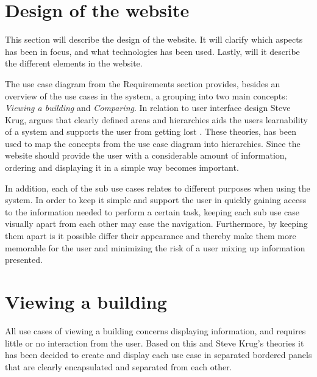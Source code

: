 \section{Design of the website}
This section will describe the design of the website. It will clarify which aspects has been in focus, and what technologies has been used. Lastly, will it describe the different elements in the website.

The use case diagram from the Requirements section provides, besides an overview of the use cases in the system, a grouping into two main concepts: \emph{Viewing a building} and \emph{Comparing}. In relation to user interface design Steve Krug, argues that clearly defined areas and hierarchies aids the users learnability of a system and supports the user from getting lost \cite{interaction}. These theories, has been used to map the concepts from the use case diagram into hierarchies. Since the website should provide the user with a considerable amount of information, ordering and displaying it in a simple way becomes important.

In addition, each of the sub use cases relates to different purposes when using the system. In order to keep it simple and support the user in quickly gaining access to the information needed to perform a certain task, keeping each sub use case visually apart from each other may ease the navigation. Furthermore, by keeping them apart is it possible differ their appearance and thereby make them more memorable for the user and minimizing the risk of a user mixing up information presented.
\section*{Viewing a building}
All use cases of viewing a building concerns displaying information, and requires little or no interaction from the user. Based on this and Steve Krug's theories it has been decided to create and display each use case in separated bordered panels that are clearly encapsulated and separated from each other.
